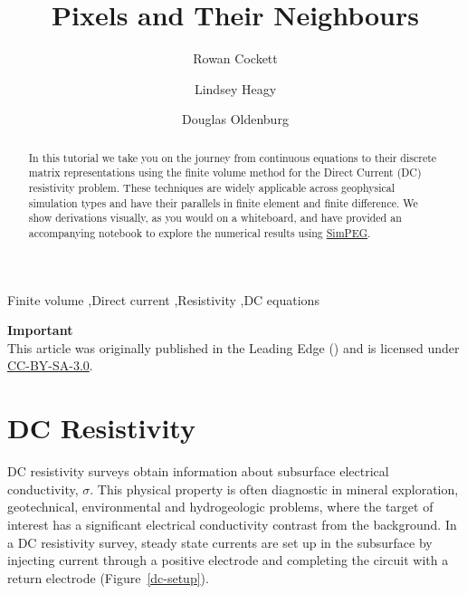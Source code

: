 \documentclass[review,authoryear,12pt]{elsarticle}
\begin{document}
\begin{frontmatter}

\title{Pixels and Their Neighbours}

\author[1]{Rowan Cockett}\author[1]{Lindsey Heagy}\author[1]{Douglas Oldenburg}

\begin{abstract}
In this tutorial we take you on the journey from continuous equations to their discrete matrix representations using the finite volume method for the Direct Current (DC) resistivity problem. These techniques are widely applicable across geophysical simulation types and have their parallels in finite element and finite difference. We show derivations visually, as you would on a whiteboard, and have provided an accompanying notebook to explore the numerical results using \href{http://simpeg.xyz/}{SimPEG}.
\end{abstract}

\begin{graphicalabstract}
\end{graphicalabstract}


\begin{keyword}
Finite volume \sep Direct current \sep Resistivity \sep DC equations
\end{keyword}

\end{frontmatter}


\begin{framed}
\textbf{Important}\\
This article was originally published in the Leading Edge (\cite{Cockett_2016}) and is licensed under \href{https://creativecommons.org/licenses/by-sa/3.0/}{CC-BY-SA-3.0}.
\end{framed}

\section{DC Resistivity}\label{DC Resistivity}

DC resistivity surveys obtain information about subsurface electrical conductivity, $\sigma$. This physical property is often diagnostic in mineral exploration, geotechnical, environmental and hydrogeologic problems, where the target of interest has a significant electrical conductivity contrast from the background. In a DC resistivity survey, steady state currents are set up in the subsurface by injecting current through a positive electrode and completing the circuit with a return electrode (Figure~\ref{dc-setup}).
\end{document}
